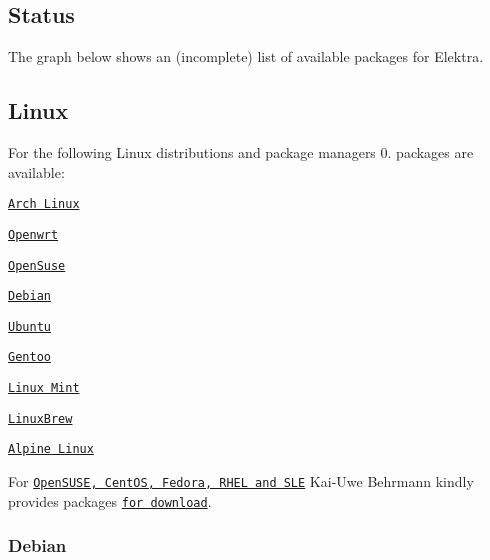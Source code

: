 \subsection*{Status}

The graph below shows an (incomplete) list of available packages for Elektra.

\href{https://repology.org/metapackage/elektra/versions}{\tt }

\subsection*{Linux}

For the following Linux distributions and package managers 0. packages are available\+:


\begin{DoxyItemize}
\item \href{https://aur.archlinux.org/packages/elektra/}{\tt Arch Linux}
\item \href{https://github.com/openwrt/packages/tree/master/libs/elektra}{\tt Openwrt}
\item \href{https://software.opensuse.org/package/elektra}{\tt Open\+Suse}
\item \href{https://packages.debian.org/de/jessie/libelektra4}{\tt Debian}
\item \href{https://launchpad.net/ubuntu/+source/elektra}{\tt Ubuntu}
\item \href{http://packages.gentoo.org/package/app-admin/elektra}{\tt Gentoo}
\item \href{https://community.linuxmint.com/software/view/elektra-bin}{\tt Linux Mint}
\item \href{https://github.com/Linuxbrew/homebrew-core/blob/master/Formula/elektra.rb}{\tt Linux\+Brew}
\item \href{https://pkgs.alpinelinux.org/package/edge/testing/x86_64/elektra}{\tt Alpine Linux}
\end{DoxyItemize}

For \href{https://build.opensuse.org/package/show/home:bekun:devel/elektra}{\tt Open\+S\+U\+SE, Cent\+OS, Fedora, R\+H\+EL and S\+LE} Kai-\/\+Uwe Behrmann kindly provides packages \href{http://software.opensuse.org/download.html?project=home%3Abekun%3Adevel&package=libelektra4}{\tt for download}.

\subsubsection*{Debian}

